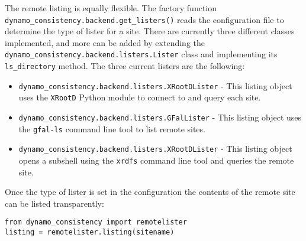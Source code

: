 The remote listing is equally flexible.
The factory function \\ \texttt{dynamo\_consistency.backend.get\_listers()}
reads the configuration file to determine the type of lister for a site.
There are currently three different classes implemented,
and more can be added by extending the \\ \texttt{dynamo\_consistency.backend.listers.Lister}
class and implementing its \\ \texttt{ls\_directory} method.
The three current listers are the following:
\begin{itemize}
\item \texttt{dynamo\_consistency.backend.listers.XRootDLister} -
  This listing object uses the \texttt{XRootD} Python module
  to connect to and query each site.
\item \texttt{dynamo\_consistency.backend.listers.GFalLister} -
  This listing object uses the \texttt{gfal-ls} command line tool to list remote sites.
\item \texttt{dynamo\_consistency.backend.listers.XRootDLister} -
  This listing object opens a subshell using the \texttt{xrdfs}
  command line tool and queries the remote site.
\end{itemize}

Once the type of lister is set in the configuration
the contents of the remote site can be listed transparently:

\begin{verbatim}
from dynamo_consistency import remotelister
listing = remotelister.listing(sitename)
\end{verbatim}

